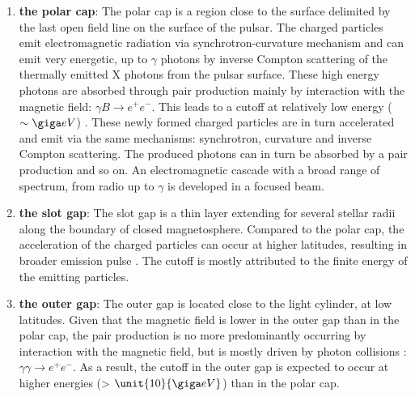\documentclass[a4paper, twoside, 12pt]{article}
\numberwithin{equation}{section}
\begin{document}
\begin{enumerate}[label=\roman*)]
\item \textbf{the polar cap}: The polar cap is a region close to the surface delimited by the last open field line on the surface of the pulsar. The charged particles emit electromagnetic radiation via synchrotron-curvature mechanism and can emit very energetic, up to $\gamma$ photons by inverse Compton scattering of the thermally emitted X photons from the pulsar surface. These high energy photons are absorbed through pair production mainly by interaction with the magnetic field:  $\gamma B \rightarrow e^{+} e^{-}$. This leads to a cutoff at relatively low energy ($\sim \giga eV$) \cite{polar_cap_model}. These newly formed charged particles are in turn accelerated and emit via the same mechanisms: synchrotron, curvature and inverse Compton scattering. The produced photons can in turn be absorbed by a pair production and so on. An electromagnetic cascade with a broad range of spectrum, from radio up to $\gamma$ is developed in a focused  beam. 
\item \textbf{the slot gap}: The slot gap is a thin layer extending for several stellar radii along the boundary of closed magnetosphere. Compared to the polar cap, the acceleration of the charged particles can occur at higher latitudes, resulting in broader emission pulse \cite{harding}. The cutoff is mostly attributed to the finite energy of the emitting particles.
\item \textbf{the outer gap}: The outer gap is located close to the light cylinder, at low latitudes. Given that the magnetic field is lower in the outer gap than in the polar cap, the pair production is no more predominantly  occurring by interaction with the magnetic field, but is mostly driven by photon collisions : $\gamma \gamma \rightarrow  e^{+} e^{-}$. As a result, the cutoff in the outer gap is expected to occur at higher energies (> $\unit{10}{\giga eV}$) than in the polar cap. 
\end{enumerate}



\newpage
\end{document}
